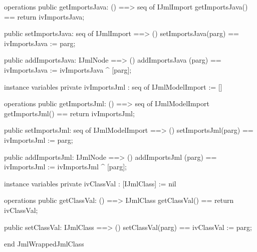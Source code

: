 \begin{vdm_al}
operations
  public getImportsJava: () ==> seq of IJmlImport
  getImportsJava() == return ivImportsJava;

  public setImportsJava: seq of IJmlImport ==> ()
  setImportsJava(parg) == ivImportsJava := parg;

  public addImportsJava: IJmlNode ==> ()
  addImportsJava (parg) == ivImportsJava := ivImportsJava ^ [parg];

instance variables
  private ivImportsJml : seq of IJmlModelImport := []

operations
  public getImportsJml: () ==> seq of IJmlModelImport
  getImportsJml() == return ivImportsJml;

  public setImportsJml: seq of IJmlModelImport ==> ()
  setImportsJml(parg) == ivImportsJml := parg;

  public addImportsJml: IJmlNode ==> ()
  addImportsJml (parg) == ivImportsJml := ivImportsJml ^ [parg];

instance variables
  private ivClassVal : [IJmlClass] := nil

operations
  public getClassVal: () ==> IJmlClass
  getClassVal() == return ivClassVal;

  public setClassVal: IJmlClass ==> ()
  setClassVal(parg) == ivClassVal := parg;

end JmlWrappedJmlClass
\end{vdm_al}


